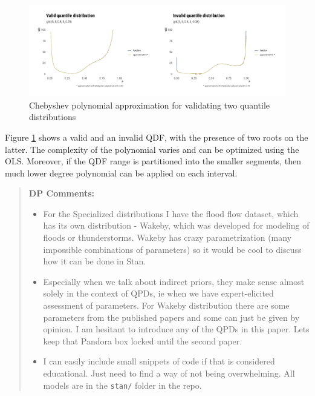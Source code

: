 \documentclass[
  12pt,
]{article}
\begin{document}
\begin{figure}

{\centering \includegraphics{ilbm_article_files/figure-latex/chebyshev-roots-funs-1} 

}

\caption{Chebyshev polynomial approximation for validating two quantile distributions}\label{fig:chebyshev-roots-funs}
\end{figure}

Figure \ref{fig:chebyshev-roots-funs} shows a valid and an invalid QDF, with the presence of two roots on the latter. The complexity of the polynomial varies and can be optimized using the OLS. Moreover, if the QDF range is partitioned into the smaller segments, then much lower degree polynomial can be applied on each interval.

\begin{quote}
\textbf{DP Comments:}

\begin{itemize}
\item
  For the Specialized distributions I have the flood flow dataset, which has its own distribution - Wakeby, which was developed for modeling of floods or thunderstorms. Wakeby has crazy parametrization (many impossible combinations of parameters) so it would be cool to discuss how it can be done in Stan.
\item
  Especially when we talk about indirect priors, they make sense almost solely in the context of QPDs, ie when we have expert-elicited assessment of parameters. For Wakeby distribution there are some parameters from the published papers and some can just be given by opinion. I am hesitant to introduce any of the QPDs in this paper. Lets keep that Pandora box locked until the second paper.
\item
  I can easily include small snippets of code if that is considered educational. Just need to find a way of not being overwhelming. All models are in the \texttt{stan/} folder in the repo.
\end{itemize}
\end{quote}
\end{document}
